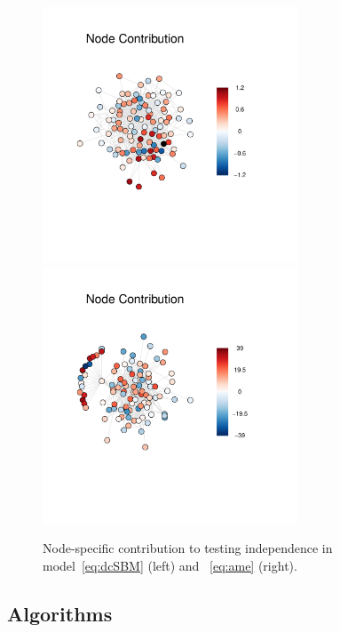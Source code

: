\documentclass[12pt]{article}
\theoremstyle{definition}
\begin{document}
\begin{figure}[H]
	\centering
	\includegraphics[width=3in]{../Figure/dcSBM_weight.pdf}
	\includegraphics[width=3in]{../Figure/ame_weight.pdf}
	\caption{Node-specific contribution to testing independence in model~\ref{eq:dcSBM} (left) and ~\ref{eq:ame} (right).}
	\label{fig:weight2}
\end{figure}


\newpage
\subsection{Algorithms}
\end{document}
